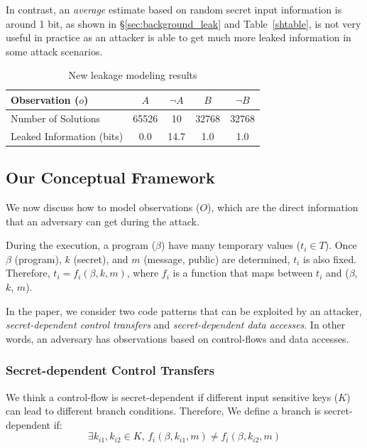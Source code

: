 In
contrast, an \emph{average} estimate based on random secret input information is around
1 bit, as shown in \S\ref{sec:background_leak} and Table~\ref{shtable}, is
not very useful in practice as an attacker is able to get much more leaked
information in some attack scenarios.

\begin{table}[ht]
    \centering\small\footnotesize
    \caption{New leakage modeling results}
    \label{shtable2}
    \vspace*{-9pt}
    \begin{tabular}{l|cc|cc}
        \hline
      
        Observation ($o$)   & $A$ & $\neg A$ & $B$ & $\neg B$ \\ \hline
        Number of Solutions & 65526       & 10        & 32768     & 32768           \\ \hline
        Leaked Information (bits) & 0.0         & 14.7      & 1.0       & 1.0         \\
        \hline
    \end{tabular}
\end{table}
\subsection{Our Conceptual Framework}
\label{side-channel:condition}
We now discuss how to model observations ($O$), which are the direct information
that an adversary can get during the attack.

During the execution, a program ($\beta$) have many temporary values ($t_i \in
T$). Once $\beta$ (program), $k$ (secret), and $m$ (message, public) are
determined, $t_i$ is also fixed. Therefore, $ t_i = f_i(\beta, k, m)$, where $f_
i$ is a function that maps between $t_i$ and ($\beta$, $k$, $m$).

In the paper, we consider two code patterns that can be exploited by an attacker,
\emph{secret-dependent control transfers} and \emph{secret-dependent data
accesses}. In other words, an adversary has observations based on control-flows
and data accesses.

\subsubsection{Secret-dependent Control Transfers}
We think a control-flow is secret-dependent if different input sensitive keys
($K$) can lead to different branch conditions. Therefore,
We define a branch is secret-dependent if:
$$\exists k_{i1}, k_{i2} \in K, \,f_i(\beta, k_{i1}, m) \neq f_i(\beta, k_{i2}, m)$$

